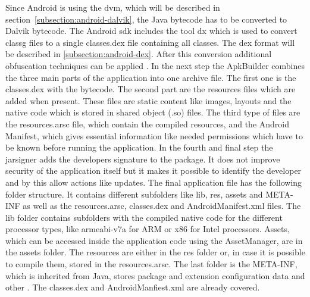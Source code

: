 Since Android is using the \gls{dvm}, which will be described in section~\ref{subsection:android-dalvik}, the Java bytecode has to be converted to Dalvik bytecode.
The Android \gls{sdk} includes the tool dx which is used to convert \gls{classg} files to a single classes.dex file containing all classes.
The \gls{dex} format will be described in \ref{subsection:android-dex}.
After this conversion additional obfuscation techniques can be applied \cite{dexProtector}.
\newline
In the next step the ApkBuilder combines the three main parts of the application into one archive file.
The first one is the classes.dex with the bytecode.
The second part are the resources files which are added when present.
These files are static content like images, layouts and the native code which is stored in shared object (.so) files.
The third type of files are the resources.arsc file, which contain the compiled resources, and the Android Manifest, which gives essential information like needed permissions which have to be known before running the application.
\newline
In the fourth and final step the jarsigner adds the developers signature to the package.
It does not improve security of the application itself but it makes it possible to identify the developer and by this allow actions like updates.
\newline
\newline
The final application file has the following folder structure.
It contains different subfolders like lib, res, assets and META-INF as well as the resources.arsc, classes.dex and AndroidManifest.xml files.
The lib folder contains subfolders with the compiled native code for the different processor types, like armeabi-v7a for ARM or x86 for Intel processors.
Assets, which can be accessed inside the application code using the AssetManager, are in the assets folder.
The resources are either in the res folder or, in case it is possible to compile them, stored in the resources.arsc.
The last folder is the META-INF, which is inherited from Java, stores package and extension configuration data and other \cite{metaJava}.
The classes.dex and AndroidManfiest.xml are already covered.
\cite{kovachevaMaster} \cite{ehringerDalvik}
